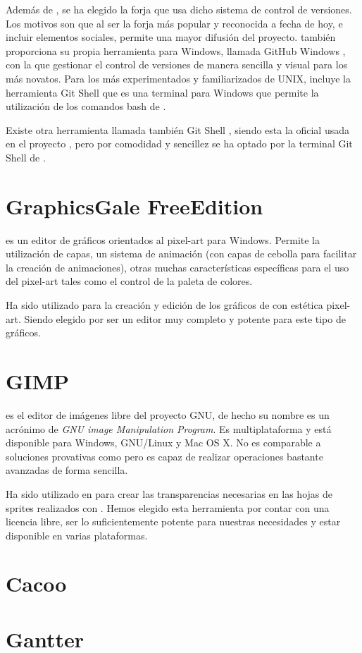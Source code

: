 Además de , se ha elegido la forja   que usa dicho sistema de control de versiones. Los motivos son que al ser la forja más popular y reconocida a fecha de hoy, e incluir elementos sociales, permite una mayor difusión del proyecto.  también proporciona su propia herramienta para Windows, llamada GitHub Windows , con la que gestionar el control de versiones de manera sencilla y visual para los más novatos. Para los más experimentados y familiarizados de UNIX, incluye la herramienta Git Shell que es una terminal para Windows que permite la utilización de los comandos bash de . 

Existe otra herramienta llamada también Git Shell , siendo esta la oficial usada en el proyecto , pero por comodidad y sencillez se ha optado por la terminal Git Shell de .

\section*{GraphicsGale FreeEdition}
  es un editor de gráficos orientados al pixel-art para Windows. Permite la utilización de capas, un sistema de animación (con capas de cebolla para facilitar la creación de animaciones), otras muchas características específicas para el uso del pixel-art tales como el control de la paleta de colores.

Ha sido utilizado para la creación y edición de los gráficos de \nombrejuego con estética pixel-art. Siendo elegido por ser un editor muy completo y potente para este tipo de gráficos.

\section*{GIMP}
  es el editor de imágenes libre del proyecto GNU, de hecho su nombre es un acrónimo de \emph{GNU image Manipulation Program}. Es multiplataforma y está disponible para Windows, GNU/Linux y Mac OS X. No es comparable a soluciones provativas como  pero es capaz de realizar operaciones bastante avanzadas de forma sencilla.

Ha sido utilizado en \nombrejuego para crear las transparencias necesarias en las hojas de sprites realizados con . Hemos elegido esta herramienta por contar con una licencia libre, ser lo suficientemente potente para nuestras necesidades y estar disponible en varias plataformas.

\section*{Cacoo}

\section*{Gantter}